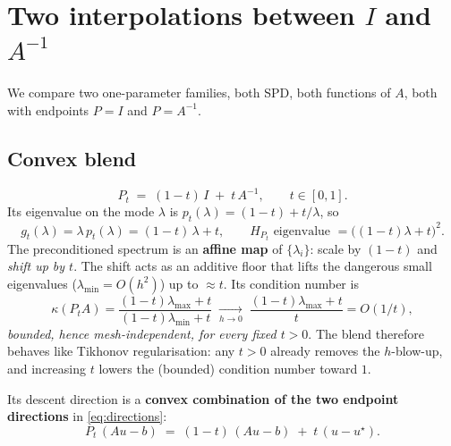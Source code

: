 \documentclass[11pt]{article}
\newcommand{\kk}{\kappa}
\newcommand{\ustar}{u^\star}
\begin{document}
\section{Two interpolations between $I$ and $A^{-1}$}

We compare two one-parameter families, both SPD, both functions of $A$, both with endpoints
$P=I$ and $P=A^{-1}$.

\subsection{Convex blend}
\begin{equation}
  \boxed{\,P_t \;=\; (1-t)\,I \;+\; t\,A^{-1}, \qquad t\in[0,1].\,}
\end{equation}
Its eigenvalue on the mode $\lambda$ is $p_t(\lambda)=(1-t)+t/\lambda$, so
\begin{equation}
  g_t(\lambda) = \lambda\,p_t(\lambda) = (1-t)\,\lambda + t,
  \qquad
  \text{$H_{P_t}$ eigenvalue } = \big((1-t)\lambda+t\big)^2 .
\end{equation}
The preconditioned spectrum is an \textbf{affine map} of $\{\lambda_i\}$: scale by $(1-t)$
and \emph{shift up by $t$}. The shift acts as an additive floor that lifts the dangerous
small eigenvalues ($\lambda_{\min}=O(h^2)$) up to $\approx t$. Its condition number is
\begin{equation}
  \kk(P_tA) = \frac{(1-t)\lambda_{\max}+t}{(1-t)\lambda_{\min}+t}
  \;\xrightarrow[h\to0]{}\; \frac{(1-t)\lambda_{\max}+t}{t} = O(1/t),
\end{equation}
\emph{bounded, hence mesh-independent, for every fixed $t>0$}. The blend therefore behaves
like Tikhonov regularisation: any $t>0$ already removes the $h$-blow-up, and increasing $t$
lowers the (bounded) condition number toward $1$.

Its descent direction is a \textbf{convex combination of the two endpoint directions} in
\eqref{eq:directions}:
\begin{equation}
  P_t\,(Au-b) \;=\; (1-t)\,(Au-b) \;+\; t\,(u-\ustar).
  \label{eq:blenddir}
\end{equation}
\end{document}
